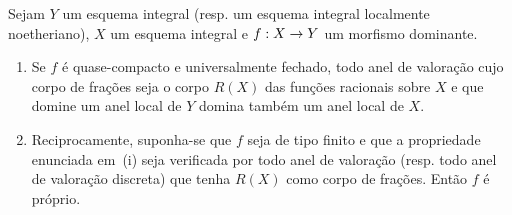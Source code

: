 \documentclass[oneside,10pt]{amsart}
\makeatletter
\newcommand{\ega@arrow}[2]{\mathchoice{#1}{#2}{#2}{#2}}
\renewcommand{\to}{\ega@arrow{\longrightarrow}{\rightarrow}}
\let\EGAOriginalLabel\label
\renewcommand{\label}[1]{\phantomsection\EGAOriginalLabel{#1}}
\makeatother
\begin{document}
\begin{corollary}[7.3.10]
\label{II.7.3.10}
Sejam $Y$ um esquema integral (resp. um esquema integral localmente noetheriano), $X$ um esquema integral e $f:X\to Y$ um morfismo dominante.
\begin{enumerate}
  \item[\rm{(i)}] Se $f$ é quase-compacto e universalmente fechado, todo anel de valoração cujo corpo de frações seja o corpo $R(X)$ das funções racionais sobre $X$ e que domine um anel local de $Y$ domina também um anel local de $X$.
  \item[\rm{(ii)}] Reciprocamente, suponha-se que $f$ seja de tipo finito e que a propriedade enunciada em~(i) seja verificada por todo anel de valoração (resp. todo anel de valoração discreta) que tenha $R(X)$ como corpo de frações.
  Então $f$ é próprio.
\end{enumerate}
\end{corollary}
\end{document}

